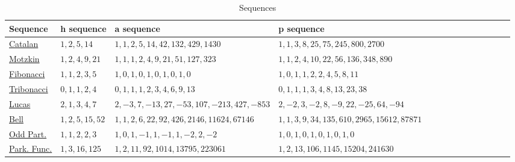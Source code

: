 \documentclass[11pt]{amsart}
\theoremstyle{definition}
\numberwithin{equation}{section}
\begin{document}
 \begin{table}[h]
    \hspace*{-1cm} 
    \begin{tabular}{|l|l|l|l||l|l|l||l|l|l|l||l|l|l|}
        \hline
        Sequence & h sequence & a sequence & p sequence \\
        \hline
        \href{https://oeis.org/A000108}{Catalan} & \(1, 2, 5, 14\) & 
        \(1, 1, 2, 5, 14, 42, 132, 429, 1430\) & 
        \(1, 1, 3, 8, 25, 75, 245, 800, 2700\) \\
        
        
        \hline
        \href{https://oeis.org/A001006}{Motzkin}  & \(1, 2, 4, 9, 21\) & 
        \(1, 1, 1, 2, 4, 9, 21, 51, 127, 323\) & 
        \(1, 1, 2, 4, 10, 22, 56, 136, 348, 890\)

          \\
        \hline
        \href{https://oeis.org/A000045}{ Fibonacci}
        & \(1, 1, 2, 3,5\) & 
        \(1, 0, 1, 0, 1, 0, 1, 0, 1, 0\) & 
        \(1, 0, 1, 1, 2, 2, 4, 5, 8, 11\)

         \\
        \hline
        \href{https://oeis.org/A000073}{Tribonacci} & \(0, 1, 1, 2, 4\) & 
        \(0, 1, 1, 1, 2, 3, 4, 6, 9, 13\) & 
        \(0, 1, 1, 1, 3, 4, 8, 13, 23, 38\)

             \\
        \hline
        \href{https://oeis.org/A000032}{Lucas} & \(2, 1, 3, 4, 7\) & 
        \(2, -3, 7, -13, 27, -53, 107, -213, 427, -853\) & 
        \(2, -2, 3, -2, 8, -9, 22, -25, 64, -94\)

         \\
        \hline
        \href{https://oeis.org/A000110}{Bell}
         & \(1, 2, 5, 15, 52\) & 
        \(1, 1, 2, 6, 22, 92, 426, 2146, 11624, 67146\) & 
        \(1, 1, 3, 9, 34, 135, 610, 2965, 15612, 87871\)


   \\
        \hline
\href{https://oeis.org/A000009}{Odd Part.}
         & \(1, 1, 2, 2, 3\) & 
        \(1, 0, 1, -1, 1, -1, 1, -2, 2, -2\) & 
        \(1, 0, 1, 0, 1, 0, 1, 0, 1, 0\)

   \\   
        \hline
        \href{https://oeis.org/A000272}{Park. Func.}
         & \(1,3, 16, 125\) & 
        \(1, 2, 11, 92, 1014, 13795, 223061\) & 
        \(1, 2, 13, 106, 1145, 15204, 241630\)

   \\  
        \hline
    \end{tabular}
    \caption{Sequences}
    \label{tab:sequences}
\end{table}
\end{document}
